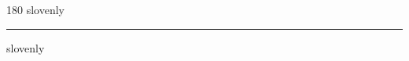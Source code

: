
\begin{frame}
\begin{center}
\begin{turn}{180}
{\fontsize{2.5cm}{1em}\selectfont slovenly}
\end{turn}
\vspace{1em}\par  
\hrule
\vspace{1em}\par  
{\fontsize{2.5cm}{1em}\selectfont slovenly}
\end{center}
\end{frame}

